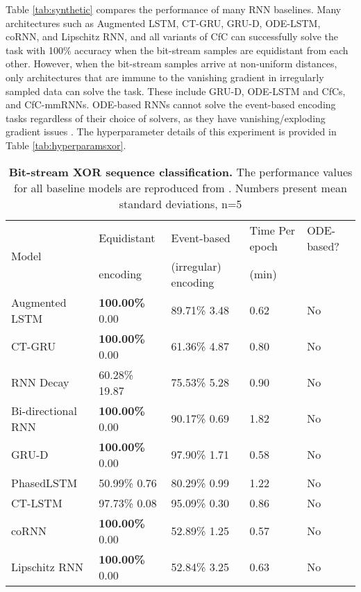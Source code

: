 \documentclass[12pt]{article}
\begin{document}
Table \ref{tab:synthetic} compares the performance of many RNN baselines. Many architectures such as Augmented LSTM, CT-GRU, GRU-D, ODE-LSTM, coRNN, and Lipschitz RNN, and all variants of CfC can successfully solve the task with 100\% accuracy when the bit-stream samples are equidistant from each other. However, when the bit-stream samples arrive at non-uniform distances, only architectures that are immune to the vanishing gradient in irregularly sampled data can solve the task. These include GRU-D, ODE-LSTM and CfCs, and CfC-mmRNNs. ODE-based RNNs cannot solve the event-based encoding tasks regardless of their choice of solvers, as they have vanishing/exploding gradient issues \cite{lechner2020learning}. The hyperparameter details of this experiment is provided in Table \ref{tab:hyperparamsxor}.

\begin{table}[t]
    \centering
    \footnotesize
    \caption{\textbf{Bit-stream XOR sequence classification.} The performance values for all baseline models are reproduced from \cite{lechner2020learning}. Numbers present mean  standard deviations, n=5}
    \begin{tabular}{lllll}
    \toprule
        \multirow{2}{*}{Model} & Equidistant & Event-based & Time Per epoch  & ODE-based? \\
                               & encoding  & (irregular) encoding & (min) & \\
        \hline
        Augmented LSTM \cite{hochreiter1997long} & \textbf{100.00\%}  0.00 & 89.71\%  3.48 & 0.62 & No\\
        CT-GRU \cite{mozer2017discrete} & \textbf{100.00\%}  0.00 & 61.36\%  4.87 & 0.80 & No \\
        RNN Decay \cite{rubanova2019latent} & 60.28\%  19.87 & 75.53\%  5.28 & 0.90 & No \\
        Bi-directional RNN \cite{schuster1997bidirectional}  & \textbf{100.00\%}  0.00 & 90.17\%  0.69 & 1.82 & No \\
        GRU-D \cite{che2018recurrent} & \textbf{100.00\%}  0.00 & 97.90\%  1.71 & 0.58 & No \\
        PhasedLSTM \cite{neil2016phased}  & 50.99\%  0.76 & 80.29\%  0.99 & 1.22 & No \\
        CT-LSTM \cite{mei2017neural} & 97.73\%  0.08 & 95.09\%  0.30 & 0.86 & No \\
        coRNN \cite{rusch2021coupled} & \textbf{100.00\%}  0.00 & 52.89\%  1.25 & 0.57 & No \\
        Lipschitz RNN \cite{erichson2021lipschitz} & \textbf{100.00\%}  0.00 & 52.84\%  3.25 & 0.63 & No \\

\end{tabular}
\end{table}
\end{document}
